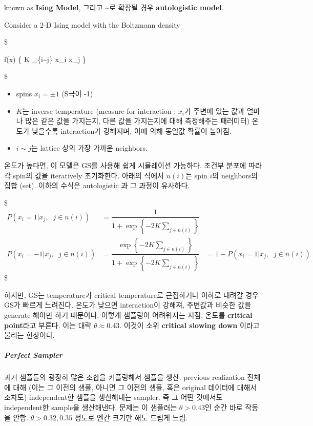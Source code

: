 \documentclass[
]{book}
\providecommand{\tightlist}{%
  \setlength{\itemsep}{0pt}\setlength{\parskip}{0pt}}
\begin{document}
known as \textbf{Ising Model}, 그리고 \textasciitilde 로 확장될 경우 \textbf{autologistic model}.

Consider a 2-D Ising model with the Boltzmann density

\$

f(\pmb x) \propto \exp \left\{ K \sum\_\{i\sim j\} x\_i x\_j \right\}

\$

\begin{itemize}
\tightlist
\item
  spins \(x_i = \pm 1\) (S극이 -1)
\item
  \(K\)는 inverse temperature (measure for interaction : \(x_i\)가 주변에 있는 값과 얼마나 많은 같은 값을 가지는지, 다른 값을 가지는지에 대해 측정해주는 패러미터) 온도가 낮을수록 interaction가 강해지며, 이에 의해 동일값 확률이 높아짐.
\item
  \(i\sim j\)는 lattice 상의 가장 가까운 neighbors.
\end{itemize}

온도가 높다면, 이 모델은 GS를 사용해 쉽게 시뮬레이션 가능하다. 조건부 분포에 따라 각 spin의 값을 iteratively 초기화한다. 아래의 식에서 \(n(i)\)는 spin \(i\)의 neighbors의 집합 (set). 이하의 수식은 autologistic 과 그 과정이 유사하다.

\$
\begin{align*}

P(x_i =1 \vert x_j, \; \; j \in n(i)) &= \dfrac {1}{1+ \exp \left \{ -2K \sum_{j \in n(i)} \right\}} \\
P(x_i =-1 \vert x_j, \; \; j \in n(i)) &= \dfrac {\exp \left \{ -2K \sum_{j \in n(i)} \right\}}{1+ \exp \left \{ -2K \sum_{j \in n(i)} \right\}} &= 1- P(x_i =1 \vert x_j, \; \; j \in n(i))

\end{align*}
\$

하지만, GS는 temperature가 critical temperature로 근접하거나 이하로 내려갈 경우 GS가 빠르게 느려진다. 온도가 낮으면 interaction이 강해져, 주변값과 비슷한 값을 generate 해야만 하기 때문이다. 이렇게 샘플링이 어려워지는 지점, 온도를 \textbf{critical point}라고 부른다. 이는 대략 \(\theta \approx 0.43\). 이것이 소위 \textbf{critical slowing down} 이라고 불리는 현상이다.

\hypertarget{perfect-sampler}{%
\subparagraph{Perfect Sampler}\label{perfect-sampler}}

과거 샘플들의 굉장히 많은 조합을 커플링해서 샘플을 생산. previous realization 전체에 대해 (이는 그 이전의 샘플, 아니면 그 이전의 샘플, 혹은 original 데이터에 대해서조차도) independent한 샘플을 생산해내는 sampler. 즉 그 어떤 것에서도 independent한 sample을 생산해낸다. 문제는 이 샘플러는 \(\theta>0.43\)인 순간 바로 작동을 안함. \(\theta>0.32, 0.35\) 정도로 엔간 크기만 해도 드럽게 느림.
\end{document}

